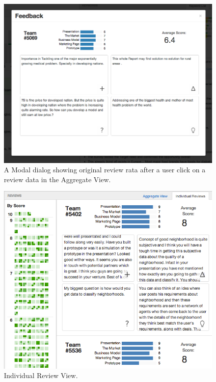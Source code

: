 \documentclass{sigchi}
\begin{document}
\begin{figure}[]
\centering
\includegraphics[width=1.4\columnwidth]{images/modal}
\caption{A Modal dialog showing original review rata after
 a user click on a review data in the Aggregate View.}
\label{fig:modal}
\end{figure}


\begin{figure}[]
\centering
\includegraphics[width=1.4\columnwidth]{images/ind-review-view}
\caption{Individual Review View.}
\label{fig:ind-view}
\end{figure}
\end{document}
